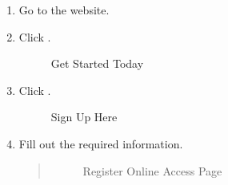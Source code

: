 \documentclass[letterpaper,10pt,english]{sphinxmanual}
\begin{document}
\clearpage

\sphinxAtStartPar
{}
\begin{enumerate}
%
\item {} 
\sphinxAtStartPar
Go to the  website.

\item {} 
\sphinxAtStartPar
Click .

\begin{figure}[htbp]
\centering
\capstart

\noindent{}
\caption{Get Started Today}\label{\detokenize{index:id2}}\end{figure}

\item {} 
\sphinxAtStartPar
Click .

\begin{figure}[htbp]
\centering
\capstart

\noindent{}
\caption{Sign Up Here}\label{\detokenize{index:id4}}\end{figure}

\item {} 
\sphinxAtStartPar
Fill out the required information.
\begin{quote}

\begin{figure}[htbp]
\centering
\capstart

\noindent{}
\caption{Register Online Access Page}\label{\detokenize{index:id6}}\end{figure}
\end{quote}

\clearpage

\end{enumerate}
\end{document}

